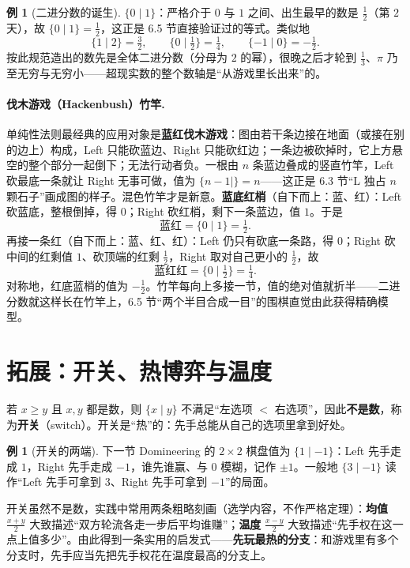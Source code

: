 \documentclass[UTF8,a4paper,11pt,oneside,openany,fontset=fandol]{ctexbook}
\theoremstyle{definition}
\newtheorem{example}[definition]{例}
\begin{document}
\begin{example}[二进分数的诞生]\label{ex:dyadic}
$\{0\mid 1\}$：严格介于 $0$ 与 $1$ 之间、出生最早的数是 $\tfrac12$（第 $2$ 天），故 $\{0\mid 1\}=\tfrac12$，这正是 6.5 节直接验证过的等式。类似地
\[
 \{1\mid 2\}=\tfrac32,\qquad \{0\mid \tfrac12\}=\tfrac14,\qquad \{-1\mid 0\}=-\tfrac12 .
\]
按此规范造出的数先是全体二进分数（分母为 $2$ 的幂），很晚之后才轮到 $\tfrac13$、$\pi$ 乃至无穷与无穷小——超现实数的整个数轴是“从游戏里长出来”的。
\end{example}

\paragraph{伐木游戏（Hackenbush）竹竿.} 单纯性法则最经典的应用对象是\textbf{蓝红伐木游戏}：图由若干条边接在地面（或接在别的边上）构成，Left 只能砍蓝边、Right 只能砍红边；一条边被砍掉时，它上方悬空的整个部分一起倒下；无法行动者负。一根由 $n$ 条蓝边叠成的竖直竹竿，Left 砍最底一条就让 Right 无事可做，值为 $\{n-1\mid\}=n$——这正是 6.3 节“L 独占 $n$ 颗石子”画成图的样子。混色竹竿才是新意。\textbf{蓝底红梢}（自下而上：蓝、红）：Left 砍蓝底，整根倒掉，得 $0$；Right 砍红梢，剩下一条蓝边，值 $1$。于是
\[
 \text{蓝红}=\{0\mid 1\}=\tfrac12 .
\]
再接一条红（自下而上：蓝、红、红）：Left 仍只有砍底一条路，得 $0$；Right 砍中间的红剩值 $1$、砍顶端的红剩 $\tfrac12$，Right 取对自己更小的 $\tfrac12$，故
\[
 \text{蓝红红}=\{0\mid \tfrac12\}=\tfrac14 .
\]
对称地，红底蓝梢的值为 $-\tfrac12$。竹竿每向上多接一节，值的绝对值就折半——二进分数就这样长在竹竿上，6.5 节“两个半目合成一目”的围棋直觉由此获得精确模型。

\section{拓展：开关、热博弈与温度}
若 $x\ge y$ 且 $x,y$ 都是数，则 $\{x\mid y\}$ 不满足“左选项 $<$ 右选项”，因此\textbf{不是数}，称为\textbf{开关}（switch）。开关是“热”的：先手总能从自己的选项里拿到好处。

\begin{example}[开关的两端]\label{ex:switch}
下一节 Domineering 的 $2\times2$ 棋盘值为 $\{1\mid -1\}$：Left 先手走成 $1$，Right 先手走成 $-1$，谁先谁赢、与 $0$ 模糊，记作 $\pm1$。一般地 $\{3\mid -1\}$ 读作“Left 先手可拿到 $3$、Right 先手可拿到 $-1$”的局面。
\end{example}

开关虽然不是数，实践中常用两条粗略刻画（选学内容，不作严格定理）：\textbf{均值} $\tfrac{x+y}{2}$ 大致描述“双方轮流各走一步后平均谁赚”；\textbf{温度} $\tfrac{x-y}{2}$ 大致描述“先手权在这一点上值多少”。由此得到一条实用的启发式——\textbf{先玩最热的分支}：和游戏里有多个分支时，先手应当先把先手权花在温度最高的分支上。
\end{document}
